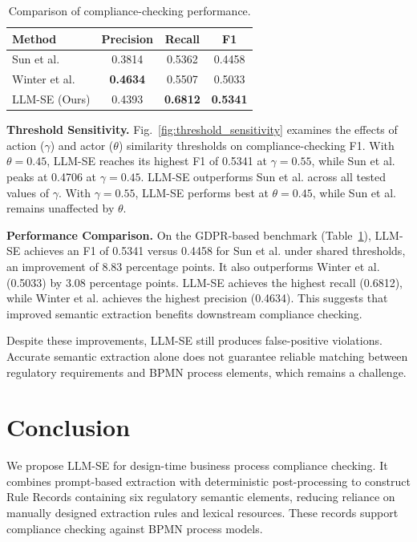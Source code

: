 \documentclass[conference]{IEEEtran}
\begin{document}
\begin{table}[t]
\centering
\caption{Comparison of compliance-checking performance.}
\label{tab:downstream_results}
\begin{tabular}{lccc}
\toprule
\textbf{Method} & \textbf{Precision} & \textbf{Recall} & \textbf{F1} \\
\midrule
Sun et al. & 0.3814 & 0.5362 & 0.4458 \\
Winter et al. & \textbf{0.4634} & 0.5507 & 0.5033 \\
LLM-SE (Ours) & 0.4393 & \textbf{0.6812} & \textbf{0.5341} \\
\bottomrule
\end{tabular}
\end{table}

\textbf{Threshold Sensitivity.}
Fig.~\ref{fig:threshold_sensitivity} examines the effects of action ($\gamma$) and actor ($\theta$) similarity thresholds on compliance-checking F1. With $\theta=0.45$, LLM-SE reaches its highest F1 of 0.5341 at $\gamma=0.55$, while Sun et al. peaks at 0.4706 at $\gamma=0.45$. LLM-SE outperforms Sun et al. across all tested values of $\gamma$. With $\gamma=0.55$, LLM-SE performs best at $\theta=0.45$, while Sun et al. remains unaffected by $\theta$.

\textbf{Performance Comparison.}
On the GDPR-based benchmark (Table~\ref{tab:downstream_results}), LLM-SE achieves an F1 of 0.5341 versus 0.4458 for Sun et al. under shared thresholds, an improvement of 8.83 percentage points. It also outperforms Winter et al. (0.5033) by 3.08 percentage points. LLM-SE achieves the highest recall (0.6812), while Winter et al. achieves the highest precision (0.4634). 
This suggests that improved semantic extraction benefits downstream compliance checking.

Despite these improvements, LLM-SE still produces false-positive violations. Accurate semantic extraction alone does not guarantee reliable matching between regulatory requirements and BPMN process elements, which remains a challenge.

\section{Conclusion}
\label{sec:5}

We propose LLM-SE for design-time business process compliance checking. It combines prompt-based extraction with deterministic post-processing to construct Rule Records containing six regulatory semantic elements, reducing reliance on manually designed extraction rules and lexical resources. These records support compliance checking against BPMN process models.
\end{document}
